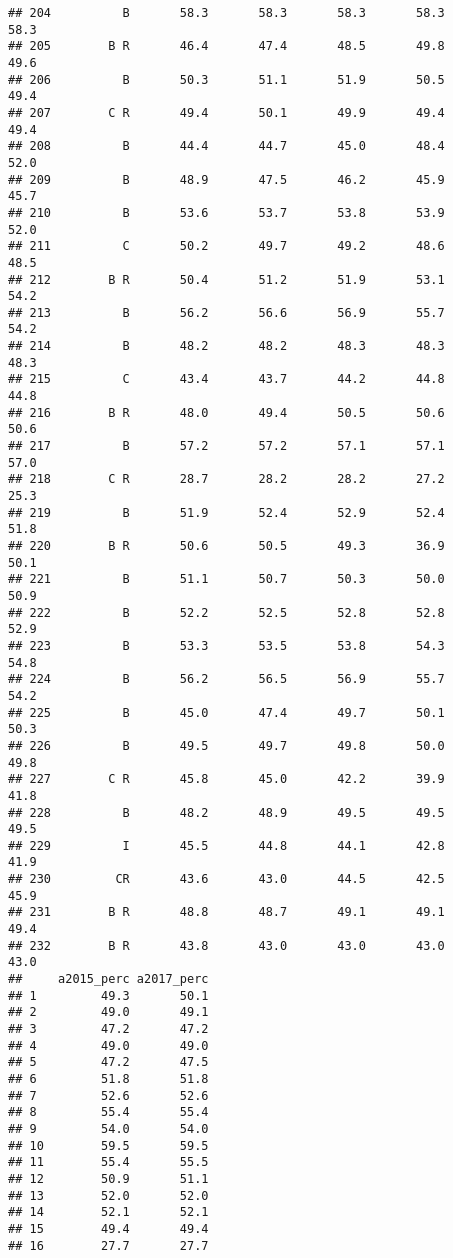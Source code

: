 \documentclass[]{article}
\begin{document}
\begin{verbatim}
## 204          B       58.3       58.3       58.3       58.3       58.3
## 205        B R       46.4       47.4       48.5       49.8       49.6
## 206          B       50.3       51.1       51.9       50.5       49.4
## 207        C R       49.4       50.1       49.9       49.4       49.4
## 208          B       44.4       44.7       45.0       48.4       52.0
## 209          B       48.9       47.5       46.2       45.9       45.7
## 210          B       53.6       53.7       53.8       53.9       52.0
## 211          C       50.2       49.7       49.2       48.6       48.5
## 212        B R       50.4       51.2       51.9       53.1       54.2
## 213          B       56.2       56.6       56.9       55.7       54.2
## 214          B       48.2       48.2       48.3       48.3       48.3
## 215          C       43.4       43.7       44.2       44.8       44.8
## 216        B R       48.0       49.4       50.5       50.6       50.6
## 217          B       57.2       57.2       57.1       57.1       57.0
## 218        C R       28.7       28.2       28.2       27.2       25.3
## 219          B       51.9       52.4       52.9       52.4       51.8
## 220        B R       50.6       50.5       49.3       36.9       50.1
## 221          B       51.1       50.7       50.3       50.0       50.9
## 222          B       52.2       52.5       52.8       52.8       52.9
## 223          B       53.3       53.5       53.8       54.3       54.8
## 224          B       56.2       56.5       56.9       55.7       54.2
## 225          B       45.0       47.4       49.7       50.1       50.3
## 226          B       49.5       49.7       49.8       50.0       49.8
## 227        C R       45.8       45.0       42.2       39.9       41.8
## 228          B       48.2       48.9       49.5       49.5       49.5
## 229          I       45.5       44.8       44.1       42.8       41.9
## 230         CR       43.6       43.0       44.5       42.5       45.9
## 231        B R       48.8       48.7       49.1       49.1       49.4
## 232        B R       43.8       43.0       43.0       43.0       43.0
##     a2015_perc a2017_perc
## 1         49.3       50.1
## 2         49.0       49.1
## 3         47.2       47.2
## 4         49.0       49.0
## 5         47.2       47.5
## 6         51.8       51.8
## 7         52.6       52.6
## 8         55.4       55.4
## 9         54.0       54.0
## 10        59.5       59.5
## 11        55.4       55.5
## 12        50.9       51.1
## 13        52.0       52.0
## 14        52.1       52.1
## 15        49.4       49.4
## 16        27.7       27.7

\end{verbatim}
\end{document}
